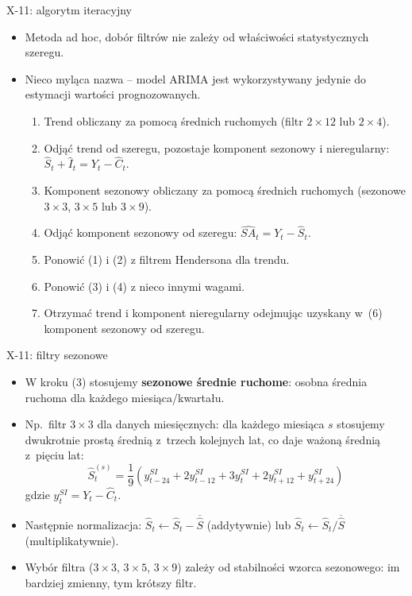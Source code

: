 \documentclass[11pt,usenames,dvipsnames,aspectratio=169]{beamer}
\begin{document}
\begin{frame}{X-11: algorytm iteracyjny}
\small
\begin{itemize}
    \item Metoda ad hoc, dobór filtrów nie zależy od właściwości statystycznych szeregu.
    \item Nieco myląca nazwa -- model ARIMA jest wykorzystywany jedynie do estymacji wartości prognozowanych.
    \begin{enumerate}
        \item Trend obliczany za pomocą średnich ruchomych (filtr $2\times 12$ lub $2\times 4$).
        \item Odjąć trend od szeregu, pozostaje komponent sezonowy i nieregularny: $\hat{S}_t + \hat{I}_t = Y_t - \hat{C}_t$.
        \item Komponent sezonowy obliczany za pomocą średnich ruchomych (sezonowe $3\times 3$, $3\times 5$ lub $3\times 9$).
        \item Odjąć komponent sezonowy od szeregu: $\hat{SA}_t = Y_t - \hat{S}_t$.
        \item Ponowić (1) i (2) z filtrem Hendersona dla trendu.
        \item Ponowić (3) i (4) z nieco innymi wagami.
        \item Otrzymać trend i komponent nieregularny odejmując uzyskany w~(6) komponent sezonowy od szeregu.
    \end{enumerate}
\end{itemize}
\end{frame}

\begin{frame}{X-11: filtry sezonowe}
\begin{itemize}
    \item W kroku (3) stosujemy \textbf{sezonowe średnie ruchome}: osobna średnia ruchoma dla każdego miesiąca/kwartału.
    \item Np.\ filtr $3\times 3$ dla danych miesięcznych: dla każdego miesiąca $s$ stosujemy dwukrotnie prostą średnią z~trzech kolejnych lat, co daje ważoną średnią z~pięciu lat:
    \[
    \hat{S}_{t}^{(s)} = \frac{1}{9}\!\left(y_{t-24}^{SI}+2y_{t-12}^{SI}+3y_t^{SI}+2y_{t+12}^{SI}+y_{t+24}^{SI}\right)
    \]
    gdzie $y_t^{SI} = Y_t - \hat{C}_t$.
    \item Następnie normalizacja: $\hat{S}_t \leftarrow \hat{S}_t - \overline{\hat{S}}$ (addytywnie) lub $\hat{S}_t \leftarrow \hat{S}_t / \overline{\hat{S}}$ (multiplikatywnie).
    \item Wybór filtra ($3\times 3$, $3\times 5$, $3\times 9$) zależy od stabilności wzorca sezonowego: im bardziej zmienny, tym krótszy filtr.
\end{itemize}
\end{frame}
\end{document}
